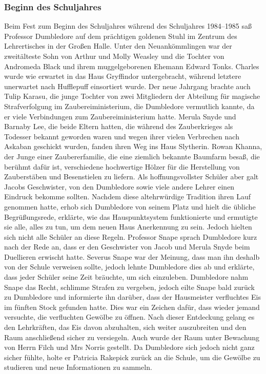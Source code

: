 \documentclass[a4paper, 10pt]{article}
\begin{document}
\subsubsection*{Beginn des Schuljahres}
Beim Fest zum Beginn des Schuljahres während des Schuljahres 1984–1985 saß Professor Dumbledore auf dem prächtigen goldenen Stuhl im Zentrum des Lehrertisches in der Großen Halle. Unter den Neuankömmlingen war der zweitälteste Sohn von Arthur und Molly Weasley und die Tochter von Andromeda Black und ihrem muggelgeborenen Ehemann Edward Tonks. Charles wurde wie erwartet in das Haus Gryffindor untergebracht, während letztere unerwartet nach Hufflepuff einsortiert wurde. Der neue Jahrgang brachte auch Tulip Karasu, die junge Tochter von zwei Mitgliedern der Abteilung für magische Strafverfolgung im Zaubereiministerium, die Dumbledore vermutlich kannte, da er viele Verbindungen zum Zaubereiministerium hatte. Merula Snyde und Barnaby Lee, die beide Eltern hatten, die während des Zauberkrieges als Todesser bekannt geworden waren und wegen ihrer vielen Verbrechen nach Askaban geschickt wurden, fanden ihren Weg ins Haus Slytherin. Rowan Khanna, der Junge einer Zaubererfamilie, die eine ziemlich bekannte Baumfarm besaß, die berühmt dafür ist, verschiedene hochwertige Hölzer für die Herstellung von Zauberstäben und Besenstielen zu liefern. Als hoffnungsvollster Schüler aber galt Jacobs Geschwister, von den Dumbledore sowie viele andere Lehrer einen Eindruck bekomme sollten.
\vspace{10pt}
\newline
{}  
Nachdem diese altehrwürdige Tradition ihren Lauf genommen hatte, erhob sich Dumbledore von seinem Platz und hielt die übliche Begrüßungsrede, erklärte, wie das Hauspunktsystem funktionierte und ermutigte sie alle, alles zu tun, um dem neuen Haus Anerkennung zu sein. Jedoch hielten sich nicht alle Schüler an diese Regeln. Professor Snape sprach Dumbledore kurz nach der Rede an, dass er den Geschwister von Jacob und Merula Snyde beim Duellieren erwischt hatte. Severus Snape war der Meinung, dass man ihn deshalb von der Schule verweisen sollte, jedoch lehnte Dumbledore dies ab und erklärte, dass jeder Schüler seine Zeit bräuchte, um sich einzuleben. Dumbledore nahm Snape das Recht, schlimme Strafen zu vergeben, jedoch eilte Snape bald zurück zu Dumbledore und informierte ihn darüber, dass der Hausmeister verfluchtes Eis im fünften Stock gefunden hatte. Dies war ein Zeichen dafür, dass wieder jemand versuchte, die verfluchten Gewölbe zu öffnen.
\vspace{10pt}
\newline
{}  
Nach dieser Entdeckung gelang es den Lehrkräften, das Eis davon abzuhalten, sich weiter auszubreiten und den Raum anschließend sicher zu versiegeln. Auch wurde der Raum unter Bewachung von Herrn Filch und Mrs Norris gestellt. Da Dumbledore
sich jedoch nicht ganz sicher fühlte, holte er Patricia Rakepick zurück an die Schule, um die Gewölbe zu studieren und neue Informationen zu sammeln.
\end{document}
